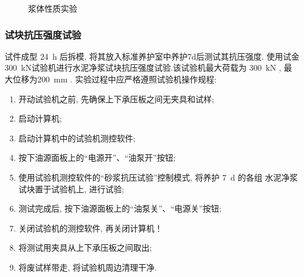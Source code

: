 \begin{figure}
    \centering
    \quad
    \caption{浆体性质实验}
\end{figure}

\subsubsection{试块抗压强度试验}
试件成型 \SI{24}{\hour} 后拆模, 将其放入标准养护室中养护7d后测试其抗压强度.
使用试金\SI{300}{\kilo\newton}试验机进行水泥净浆试块抗压强度试验.该试验机最大荷载为 \SI{300}{\kilo\newton} , 最大位移为\SI{200}{\milli\meter} .
实验过程中应严格遵照试验机操作规程: 
\begin{enumerate}[wide, labelwidth=!, labelindent=0pt]
    \item 开动试验机之前, 先确保上下承压板之间无夹具和试样; 
    \item 启动计算机; 
    \item 启动计算机中的试验机测控软件; 
    \item 按下油源面板上的“电源开”、“油泵开”按钮; 
    \item 使用试验机测控软件的“砂浆抗压试验”控制模式, 将养护 \SI{7}{\day} 的各组  水泥净浆试块置于试验机上, 进行试验; 
    \item 测试完成后, 按下油源面板上的“油泵关”、“电源关”按钮; 
    \item 关闭试验机的测控软件, 再关闭计算机！
    \item 将测试用夹具从上下承压板之间取出; 
    \item 将废试样带走, 将试验机周边清理干净.
\end{enumerate}

